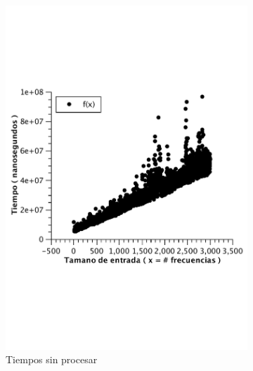\begin{figure}[H]
        \centering
        \begin{subfigure}[b]{0.5\textwidth}
                \includegraphics[width=\textwidth]{imagenes/af-wc-nlogn.pdf}
                \caption{Tiempos sin procesar}
        \end{subfigure}%
        ~ %
        \begin{subfigure}[b]{0.5\textwidth}

\end{subfigure}
\end{figure}
